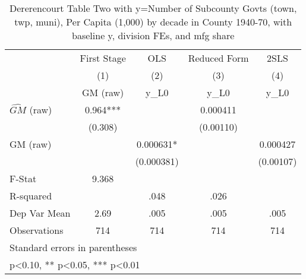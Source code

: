 \begin{table}[htbp]\centering
\def\sym#1{\ifmmode^{#1}\else\(^{#1}\)\fi}
\caption{Dererencourt Table Two with y=Number of Subcounty Govts (town, twp, muni), Per Capita (1,000) by decade in County 1940-70, with baseline y, division FEs, and mfg share}
\begin{tabular}{l*{4}{c}}
\toprule
                    & First Stage   &         OLS   &Reduced Form   &        2SLS   \\
                    &\multicolumn{1}{c}{(1)}&\multicolumn{1}{c}{(2)}&\multicolumn{1}{c}{(3)}&\multicolumn{1}{c}{(4)}\\
                    &\multicolumn{1}{c}{GM  (raw)}&\multicolumn{1}{c}{y\_L0}&\multicolumn{1}{c}{y\_L0}&\multicolumn{1}{c}{y\_L0}\\
\midrule
$\hat{GM}$ (raw)    &       0.964***&               &    0.000411   &               \\
                    &     (0.308)   &               &   (0.00110)   &               \\
\addlinespace
GM  (raw)           &               &    0.000631*  &               &    0.000427   \\
                    &               &  (0.000381)   &               &   (0.00107)   \\
\midrule
F-Stat              &       9.368   &               &               &               \\
R-squared           &               &        .048   &        .026   &               \\
Dep Var Mean        &        2.69   &        .005   &        .005   &        .005   \\
Observations        &         714   &         714   &         714   &         714   \\
\bottomrule
\multicolumn{5}{l}{\footnotesize Standard errors in parentheses}\\
\multicolumn{5}{l}{\footnotesize * p<0.10, ** p<0.05, *** p<0.01}\\
\end{tabular}
\end{table}
